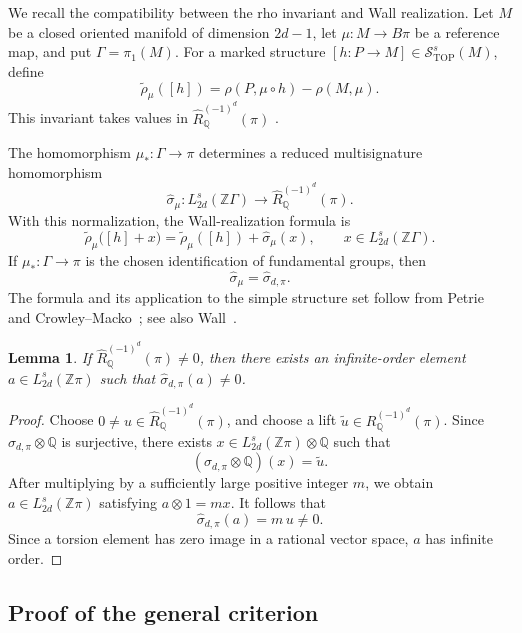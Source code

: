 \documentclass[10pt,reqno]{amsart}
\numberwithin{equation}{section}
\newtheorem{lemma}{Lemma}
\theoremstyle{definition}
\theoremstyle{remark}
\newcommand{\Z}{\mathbb Z}
\newcommand{\Q}{\mathbb Q}
\newcommand{\TOP}{\mathrm{TOP}}
\newcommand{\cS}{\mathcal S}
\newcommand{\rhot}{\widetilde{\rho}}
\begin{document}
We recall the compatibility between the rho invariant and Wall
realization.  Let \(M\) be a closed oriented manifold of dimension
\(2d-1\), let \(\mu\colon M\to B\pi\) be a reference map, and put
\(\Gamma=\pi_1(M)\).  For a marked structure
\([h\colon P\to M]\in\cS^s_{\TOP}(M)\), define
\[
\rhot_\mu([h])
=
\rho(P,\mu\circ h)-\rho(M,\mu).
\]
This invariant takes values in
\(\widehat R^{(-1)^d}_{\Q}(\pi)\)
\cite[Definitions~2.2 and~2.5]{CrowleyMacko}.

The homomorphism \(\mu_*\colon\Gamma\to\pi\) determines a reduced
multisignature homomorphism
\[
\widehat\sigma_\mu\colon
L_{2d}^s(\Z\Gamma)
\longrightarrow
\widehat R^{(-1)^d}_{\Q}(\pi).
\]
With this normalization, the Wall-realization formula is
\begin{equation}\label{eq:general-rho-wall}
\rhot_\mu\bigl([h]+x\bigr)
=
\rhot_\mu([h])
+
\widehat\sigma_\mu(x),
\qquad
x\in L_{2d}^s(\Z\Gamma).
\end{equation}
If \(\mu_*\colon\Gamma\to\pi\) is the chosen identification of
fundamental groups, then
\[
\widehat\sigma_\mu
=\widehat\sigma_{d,\pi}.
\]
The formula and its application to the
simple structure set follow from Petrie~\cite{Petrie} and
Crowley--Macko~\cite[Equation~(1.2) and Remark~1.7]{CrowleyMacko};
see also Wall~\cite[Chapter~14]{Wall}.

\begin{lemma}\label{lem:criterion-wall-element}
If \(\widehat R^{(-1)^d}_{\Q}(\pi)\neq0\), then there exists an
infinite-order element \(a\in L_{2d}^s(\Z\pi)\) such that
\(\widehat\sigma_{d,\pi}(a)\neq0\).
\end{lemma}

\begin{proof}
Choose \(0\neq u\in\widehat R^{(-1)^d}_{\Q}(\pi)\), and choose a lift
\(\widetilde u\in R^{(-1)^d}_{\Q}(\pi)\).  Since
\(\sigma_{d,\pi}\otimes\Q\) is surjective, there exists
\(x\in L_{2d}^s(\Z\pi)\otimes\Q\) such that
\[
(\sigma_{d,\pi}\otimes\Q)(x)=\widetilde u.
\]
After multiplying by a sufficiently large positive integer \(m\), we
obtain \(a\in L_{2d}^s(\Z\pi)\) satisfying \(a\otimes1=mx\).  It
follows that
\[
\widehat\sigma_{d,\pi}(a)=m\,u\neq0.
\]
Since a torsion element has zero image in a rational vector space,
\(a\) has infinite order.
\end{proof}

\subsection{Proof of the general criterion}
\end{document}
